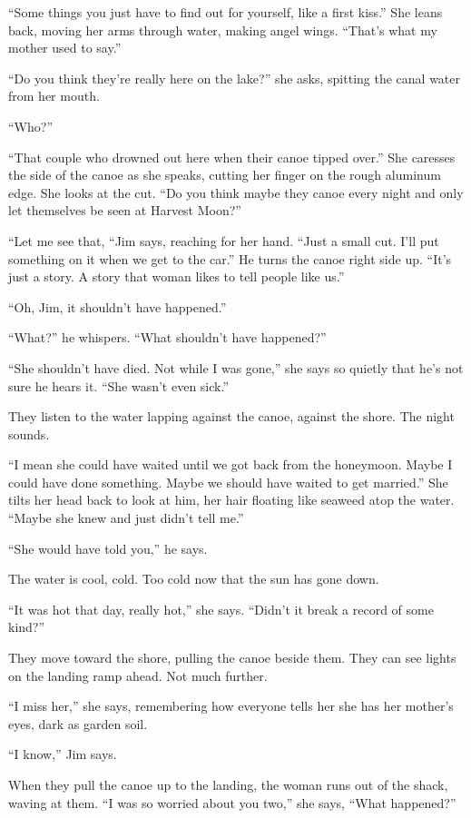 \documentclass[twoside,10pt]{book}
\begin{document}
``Some things you just have to find out for yourself, like a first
kiss.'' She leans back, moving her arms through water, making angel
wings. ``That's what my mother used to say.''

``Do you think they're really here on the lake?'' she asks, spitting the
canal water from her mouth.

``Who?''

``That couple who drowned out here when their canoe tipped over.'' She
caresses the side of the canoe as she speaks, cutting her finger on the
rough aluminum edge. She looks at the cut. ``Do you think maybe they
canoe every night and only let themselves be seen at Harvest Moon?''

``Let me see that, ``Jim says, reaching for her hand. ``Just a small
cut. I'll put something on it when we get to the car.'' He turns the
canoe right side up. ``It's just a story. A story that woman likes to
tell people like us.''

``Oh, Jim, it shouldn't have happened.''

``What?'' he whispers. ``What shouldn't have happened?''

``She shouldn't have died. Not while I was gone,'' she says so quietly
that he's not sure he hears it. ``She wasn't even sick.''

They listen to the water lapping against the canoe, against the shore.
The night sounds.

``I mean she could have waited until we got back from the honeymoon.
Maybe I could have done something. Maybe we should have waited to get
married.'' She tilts her head back to look at him, her hair floating
like seaweed atop the water. ``Maybe she knew and just didn't tell me.''

``She would have told you,'' he says.

The water is cool, cold. Too cold now that the sun has gone down.

``It was hot that day, really hot,'' she says. ``Didn't it break a
record of some kind?''

They move toward the shore, pulling the canoe beside them. They can see
lights on the land­ing ramp ahead. Not much further.

``I miss her,'' she says, remembering how everyone tells her she has her
mother's eyes, dark as garden soil.

``I know,'' Jim says.

When they pull the canoe up to the landing, the woman runs out of the
shack, waving at them. ``I was so worried about you two,'' she says,
``What happened?''
\end{document}
